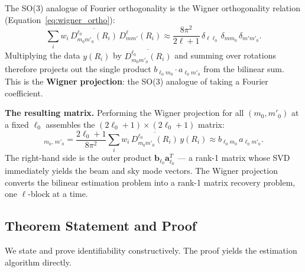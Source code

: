 \documentclass{aastex631}
\theoremstyle{plain}
\theoremstyle{remark}
\begin{document}
The SO(3) analogue of Fourier orthogonality is the Wigner
orthogonality relation (Equation~\ref{eq:wigner_ortho}):
\begin{equation*}
  \sum_i w_i\, \overline{D^{\ell_0}_{m_0 m'_0}(R_i)}\,
  D^\ell_{mm'}(R_i)
  \approx \frac{8\pi^2}{2\ell+1}\,
  \delta_{\ell\ell_0}\,\delta_{mm_0}\,\delta_{m'm'_0}.
\end{equation*}
Multiplying the data $y(R_i)$ by $\overline{D^{\ell_0}_{m_0 m'_0}(R_i)}$
and summing over rotations therefore projects out the single product
$b_{\ell_0 m_0} \cdot a_{\ell_0 m'_0}$ from the bilinear sum.
This is the \textbf{Wigner projection}: the SO(3) analogue of taking
a Fourier coefficient.

\textbf{The resulting matrix.}
Performing the Wigner projection for all $(m_0, m'_0)$ at a fixed $\ell_0$
assembles the $(2\ell_0+1)\times(2\ell_0+1)$ matrix:
\begin{equation}
  [\hat{X}_{\ell_0}]_{m_0,\,m'_0}
  = \frac{2\ell_0+1}{8\pi^2}
    \sum_i w_i\,\overline{D^{\ell_0}_{m_0 m'_0}(R_i)}\,y(R_i)
  \approx b_{\ell_0 m_0}\, a_{\ell_0 m'_0}.
\end{equation}
The right-hand side is the outer product
$\mathbf{b}_{\ell_0}\mathbf{a}_{\ell_0}^T$ --- a rank-1 matrix whose
SVD immediately yields the beam and sky mode vectors.
The Wigner projection converts the bilinear estimation problem into a
rank-1 matrix recovery problem, one $\ell$-block at a time.

\subsection{Theorem Statement and Proof}

We state and prove identifiability constructively.
The proof yields the estimation algorithm directly.
\end{document}
